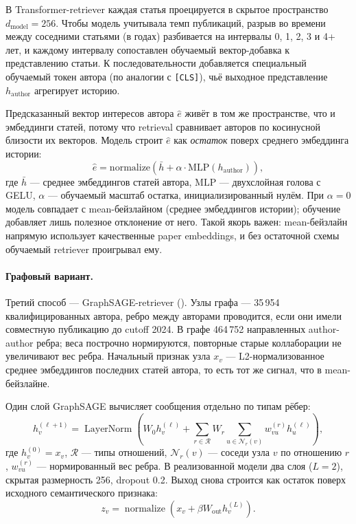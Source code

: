 В Transformer-retriever каждая статья проецируется в скрытое пространство
$d_{\text{model}} = 256$. Чтобы модель учитывала темп публикаций, разрыв во времени между соседними
статьями (в годах) разбивается на интервалы 0, 1, 2, 3 и 4+ лет, и каждому интервалу сопоставлен
обучаемый вектор-добавка к представлению статьи. К последовательности добавляется специальный
обучаемый токен автора (по аналогии с \texttt{[CLS]}), чьё выходное представление
$h_{\mathrm{author}}$ агрегирует историю.

Предсказанный вектор интересов автора $\hat{e}$ живёт в том же пространстве, что и эмбеддинги
статей, потому что retrieval сравнивает авторов по косинусной близости их векторов. Модель строит
$\hat{e}$ как \emph{остаток} поверх среднего эмбеддинга истории:
\begin{equation}
\label{eq:author-emb}
\hat{e} = \mathrm{normalize}\!\left(\bar{h} + \alpha \cdot \mathrm{MLP}(h_{\mathrm{author}})\right),
\end{equation}
где $\bar{h}$ — среднее эмбеддингов статей автора, $\mathrm{MLP}$ — двухслойная голова с GELU,
$\alpha$ — обучаемый масштаб остатка, инициализированный нулём. При $\alpha = 0$ модель совпадает
с mean-бейзлайном (среднее эмбеддингов истории); обучение добавляет лишь полезное отклонение от
него. Такой якорь важен: mean-бейзлайн напрямую использует качественные paper embeddings, и без
остаточной схемы обучаемый retriever проигрывал ему.

\paragraph{Графовый вариант.} Третий способ — GraphSAGE-retriever
(). Узлы графа — 35\,954 квалифицированных автора, ребро
между авторами проводится, если они имели совместную публикацию до cutoff 2024. В графе
464\,752 направленных author-author ребра; веса построчно нормируются, повторные старые
коллаборации не увеличивают вес ребра. Начальный признак узла $x_v$ — L2-нормализованное среднее
эмбеддингов последних статей автора, то есть тот же сигнал, что в mean-бейзлайне.

Один слой GraphSAGE вычисляет сообщения отдельно по типам рёбер:
\begin{equation}
\label{eq:graphsage-layer}
h_v^{(\ell+1)} =
\operatorname{LayerNorm}\!\left(
W_0 h_v^{(\ell)} +
\sum_{r \in \mathcal{R}} W_r
\sum_{u \in \mathcal{N}_r(v)} w_{vu}^{(r)} h_u^{(\ell)}
\right),
\end{equation}
где $h_v^{(0)} = x_v$, $\mathcal{R}$ — типы отношений, $\mathcal{N}_r(v)$ — соседи узла $v$ по
отношению $r$, $w_{vu}^{(r)}$ — нормированный вес ребра. В реализованной модели два слоя
($L = 2$), скрытая размерность 256, dropout 0.2. Выход снова строится как остаток поверх исходного
семантического признака:
\begin{equation}
\label{eq:graphsage-out}
z_v = \operatorname{normalize}\!\left(x_v + \beta W_{\mathrm{out}} h_v^{(L)}\right).
\end{equation}

